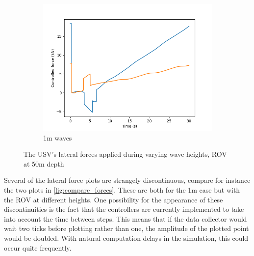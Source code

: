 \documentclass[class=article, crop=false]{standalone}
\begin{document}
\begin{figure}
\begin{subfigure}{0.65\textwidth}
        \includegraphics{scenario1/rov-50m/1.0m/usv_forces}
        \caption{1m waves}
        \label{fig:position_controlled_1m}
    \end{subfigure}
    \vfill
    \caption{The USV's lateral forces applied during varying wave heights, ROV at 50m depth}
    \label{fig:lateral_forces}
\end{figure}

Several of the lateral force plots are strangely discontinuous, compare for instance the two plots in \cref{fig:compare_forces}. These are both for the 1m case but with the ROV at different heights. One possibility for the appearance of these discontinuities is the fact that the controllers are currently implemented to take into account the time between steps. This means that if the data collector would wait two ticks before plotting rather than one, the amplitude of the plotted point would be doubled. With natural computation delays in the simulation, this could occur quite frequently.
\end{document}

